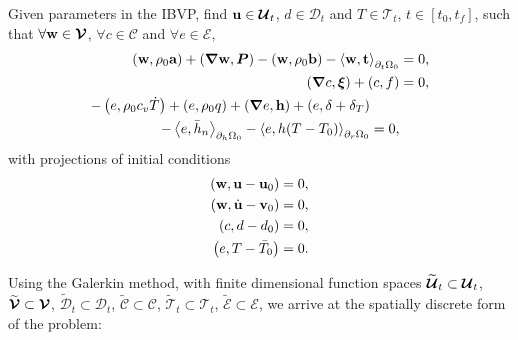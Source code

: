 \begin{mdframed}[
    frametitle={The weak form},
    frametitlebackgroundcolor=gray!20,
    backgroundcolor=gray!5,
    linewidth=0pt,
    nobreak=true
  ]
  Given parameters in the IBVP, find $\textbf{u} \in \boldsymbol{\mathcal{U}}_t$, $d \in \mathcal{D}_t$ and $T \in \mathcal{T}_t$, $t \in [t_0, t_f]$, such that $\forall \textbf{w} \in \boldsymbol{\mathcal{V}}$, $\forall c \in \mathcal{C}$ and $\forall e \in \mathcal{E}$,
  \begin{subequations}
    \begin{align}
      \left( \textbf{w}, \rho_0\textbf{a} \right) + \left( \boldsymbol{\nabla} \textbf{w}, \boldsymbol{P} \right) - \left( \textbf{w}, \rho_0 \textbf{b} \right) - \left< \textbf{w}, \textbf{t} \right>_{\partial_t\Omega_0} & = 0, \\
      \left( \boldsymbol{\nabla} c, \boldsymbol{\xi} \right) + \left( c, f \right)                                                                                               & = 0, \\
      \begin{split}
        - \left( e, \rho_0c_v\dot{T} \right) + \left( e, \rho_0q \right) + \left( \boldsymbol{\nabla} e, \textbf{h} \right) + \left( e, \delta+\delta_T \right)& \\
        - \left< e, \bar{h}_n \right>_{\partial_h\Omega_0} - \left< e, h(T-T_0) \right>_{\partial_r\Omega_0} &= 0,
      \end{split}
    \end{align}
  \end{subequations}
  with projections of initial conditions
  \begin{subequations}
    \begin{align}
      \left( \textbf{w}, \textbf{u} - \textbf{u}_0 \right)       & = 0, \\
      \left( \textbf{w}, \dot{\textbf{u}} - \textbf{v}_0 \right) & = 0, \\
      \left( c, d - d_0 \right)                & = 0, \\
      \left( e, T - \bar{T}_0 \right)          & = 0. 
    \end{align}
  \end{subequations}
\end{mdframed}
Using the Galerkin method, with finite dimensional function spaces $\widetilde{\boldsymbol{\mathcal{U}}}_t \subset \boldsymbol{\mathcal{U}}_t$, $\widetilde{\boldsymbol{\mathcal{V}}} \subset \boldsymbol{\mathcal{V}}$, $\widetilde{\mathcal{D}}_t \subset \mathcal{D}_t$, $\widetilde{\mathcal{C}} \subset \mathcal{C}$, $\widetilde{\mathcal{T}}_t \subset \mathcal{T}_t$, $\widetilde{\mathcal{E}} \subset \mathcal{E}$, we arrive at the spatially discrete form of the problem:
